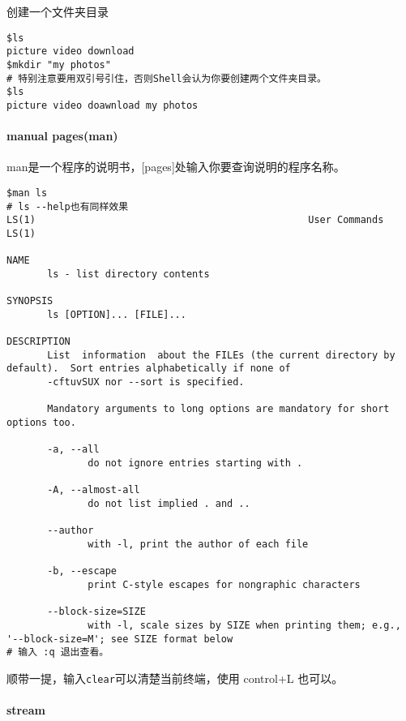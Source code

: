 \documentclass[
]{article}
\begin{document}
创建一个文件夹目录

\begin{verbatim}
$ls
picture video download
$mkdir "my photos"
# 特别注意要用双引号引住，否则Shell会认为你要创建两个文件夹目录。
$ls
picture video doawnload my photos
\end{verbatim}

\hypertarget{manual-pagesman}{%
\paragraph{manual pages(man)}\label{manual-pagesman}}

man是一个程序的说明书，{[}pages{]}处输入你要查询说明的程序名称。

\begin{verbatim}
$man ls
# ls --help也有同样效果
LS(1)                                               User Commands                                               LS(1)

NAME
       ls - list directory contents

SYNOPSIS
       ls [OPTION]... [FILE]...

DESCRIPTION
       List  information  about the FILEs (the current directory by default).  Sort entries alphabetically if none of
       -cftuvSUX nor --sort is specified.

       Mandatory arguments to long options are mandatory for short options too.

       -a, --all
              do not ignore entries starting with .

       -A, --almost-all
              do not list implied . and ..

       --author
              with -l, print the author of each file

       -b, --escape
              print C-style escapes for nongraphic characters

       --block-size=SIZE
              with -l, scale sizes by SIZE when printing them; e.g., '--block-size=M'; see SIZE format below
# 输入 :q 退出查看。
\end{verbatim}

顺带一提，输入\texttt{clear}可以清楚当前终端，使用 control+L 也可以。

\hypertarget{stream}{%
\paragraph{\texorpdfstring{\textbf{stream}}{stream}}\label{stream}}
\end{document}
